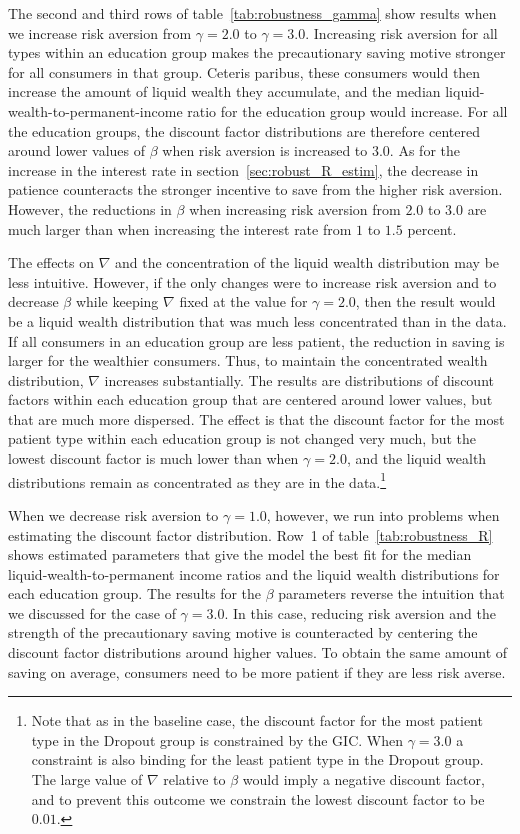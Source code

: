 \documentclass[\econtexRoot/EGMN]{subfiles}
\begin{document}
The second and third rows of table~\ref{tab:robustness_gamma} show results when we increase risk aversion from $\gamma=2.0$ to $\gamma=3.0$. Increasing risk aversion for all types within an education group makes the precautionary saving motive stronger for all consumers in that group. Ceteris paribus, these consumers would then increase the amount of liquid wealth they accumulate, and the median liquid-wealth-to-permanent-income ratio for the education group would increase. For all the education groups, the discount factor distributions are therefore centered around lower values of $\beta$ when risk aversion is increased to $3.0$. As for the increase in the interest rate in section~\ref{sec:robust_R_estim}, the decrease in patience counteracts the stronger incentive to save from the higher risk aversion. However, the reductions in $\beta$ when increasing risk aversion from $2.0$ to $3.0$ are much larger than when increasing the interest rate from $1$ to $1.5$ percent.

The effects on $\nabla$ and the concentration of the liquid wealth distribution may be less intuitive. However, if the only changes were to increase risk aversion and to decrease $\beta$ while keeping $\nabla$ fixed at the value for $\gamma=2.0$, then the result would be a liquid wealth distribution that was much less concentrated than in the data. If all consumers in an education group are less patient, the reduction in saving is larger for the wealthier consumers. Thus, to maintain the concentrated wealth distribution, $\nabla$ increases substantially. The results are distributions of discount factors within each education group that are centered around lower values, but that are much more dispersed. The effect is that the discount factor for the most patient type within each education group is not changed very much, but the lowest discount factor is much lower than when $\gamma=2.0$, and the liquid wealth distributions remain as concentrated as they are in the data.\footnote{Note that as in the baseline case, the discount factor for the most patient type in the Dropout group is constrained by the GIC. When $\gamma=3.0$ a constraint is also binding for the least patient type in the Dropout group. The large value of $\nabla$ relative to $\beta$ would imply a negative discount factor, and to prevent this outcome we constrain the lowest discount factor to be $0.01$.}

When we decrease risk aversion to $\gamma=1.0$, however, we run into problems when estimating the discount factor distribution. Row~1 of table~\ref{tab:robustness_R} shows estimated parameters that give the model the best fit for the median liquid-wealth-to-permanent income ratios and the liquid wealth distributions for each education group. The results for the $\beta$ parameters reverse the intuition that we discussed for the case of $\gamma=3.0$. In this case, reducing risk aversion and the strength of the precautionary saving motive is counteracted by centering the discount factor distributions around higher values. To obtain the same amount of saving on average, consumers need to be more patient if they are less risk averse.
\end{document}
